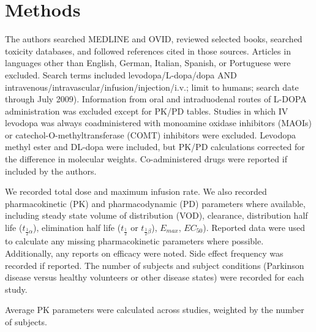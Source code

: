\section{Methods}
The authors searched MEDLINE and OVID, reviewed selected books, searched toxicity databases, and followed references cited in those sources. Articles in languages other than English, German, Italian, Spanish, or Portuguese were excluded. Search terms included levodopa/L-dopa/dopa AND intravenous/intravascular/infusion/injection/i.v.; limit to humans; search date through July 2009). Information from oral and intraduodenal routes of L-DOPA administration was excluded except for PK/PD tables.  Studies in which IV levodopa was always coadministered with monoamine oxidase inhibitors (MAOIs) or catechol-O-methyltransferase (COMT) inhibitors were excluded.  Levodopa methyl ester \cite{3601092} and DL-dopa \cite{14430381} were included, but PK/PD calculations corrected for the difference in molecular weights.  Co-administered drugs were reported if included by the authors.

We recorded total dose and maximum infusion rate.  We also recorded pharmacokinetic (PK) and pharmacodynamic (PD) parameters where available, including steady state volume of distribution (VOD), clearance, distribution half life ($t_{\frac{1}{2}\alpha}$), elimination half life ($t_{\frac{1}{2}}$ or $t_{\frac{1}{2}\beta}$), $E_{max}$, $EC_{50}$).   Reported data were used to calculate any missing pharmacokinetic parameters where possible.  Additionally, any reports on efficacy were noted.  Side effect frequency was recorded if reported. The number of subjects and subject conditions (Parkinson disease versus healthy volunteers or other disease states) were recorded for each study. 

Average PK parameters were calculated across studies, weighted by the number of subjects.